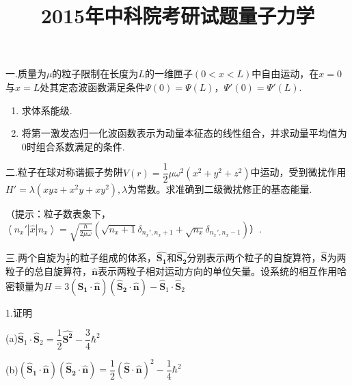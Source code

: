\documentclass[UTF8]{ctexart}
\author{}
\date{}
\begin{document}
\title{2015年中科院考研试题量子力学}

\maketitle



一.质量为$\mu$的粒子限制在长度为$L$的一维匣子$(0<x<L)$中自由运动，在$x=0$与$x=L$处其定态波函数满足条件$\Psi(0)=\Psi(L)$，$\Psi'(0)=\Psi'(L)$.
\begin{enumerate}
\item 求体系能级.
\item 将第一激发态归一化波函数表示为动量本征态的线性组合，并求动量平均值为$0$时组合系数满足的条件.
\end{enumerate}

二.粒子在球对称谐振子势阱$V\left(r\right)=\dfrac{1}{2}\mu\omega^{2}\left(x^{2}+y^{2}+z^{2}\right)$中运动，受到微扰作用$H'=\lambda\left(xyz+x^{2}y+xy^{2}\right),\lambda$为常数。求准确到二级微扰修正的基态能量.

（提示：粒子数表象下，$\left\langle n_{x}'\left|\hat{x}\right|n_{x}\right\rangle =\sqrt{\frac{\hbar}{2\mu\omega}}\left(\sqrt{n_{x}+1}\delta_{n_{x}',n_{x}+1}+\sqrt{n_{x}}\delta_{n_{x}',n_{x}-1}\right)$）.


三.两个自旋为$\frac{1}{2}$的粒子组成的体系，$\boldsymbol{\hat{S_{1}}}$和$\boldsymbol{\hat{S_{2}}}$分别表示两个粒子的自旋算符，$\boldsymbol{\hat{S}}$为两粒子的总自旋算符，$\boldsymbol{\hat{\boldsymbol{n}}}$表示两粒子相对运动方向的单位矢量。设系统的相互作用哈密顿量为$H=3\left(\boldsymbol{\hat{S}_{1}}\cdot\boldsymbol{\hat{\boldsymbol{n}}}\right)\left(\boldsymbol{\hat{S}_{2}}\cdot\boldsymbol{\hat{\boldsymbol{n}}}\right)-\boldsymbol{\hat{S}}_{1}\cdot\boldsymbol{\hat{S}}_{2}$

1.证明

(a)$\boldsymbol{\hat{S}}_{1}\cdot\boldsymbol{\hat{S}}_{2}=\dfrac{1}{2}\boldsymbol{\hat{S^{2}}}-\dfrac{3}{4}\hbar^{2}$

(b)$\left(\boldsymbol{\hat{S}_{1}}\cdot\boldsymbol{\hat{\boldsymbol{n}}}\right)\left(\boldsymbol{\hat{S}_{2}}\cdot\boldsymbol{\hat{\boldsymbol{n}}}\right)=\dfrac{1}{2}\left(\boldsymbol{\hat{S}}\cdot\boldsymbol{\hat{n}}\right)^{2}-\dfrac{1}{4}\hbar^{2}$
\end{document}
